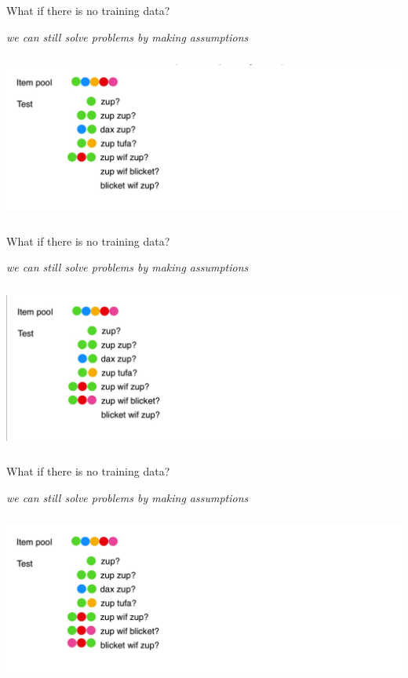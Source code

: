 \begin{frame}{What if there is no training data?}
\centerline{\textit{we can still solve problems by making assumptions}}
\centering\includegraphics[height=5.5cm]{image/img192229.jpg}

\end{frame}
\begin{frame}{What if there is no training data?}
\centerline{\textit{we can still solve problems by making assumptions}}
\centering\includegraphics[height=5.5cm]{image/img192318.jpg}

\end{frame}
\begin{frame}{What if there is no training data?}
\centerline{\textit{we can still solve problems by making assumptions}}
\centering\includegraphics[height=5.5cm]{image/img192345.jpg}

\end{frame}
